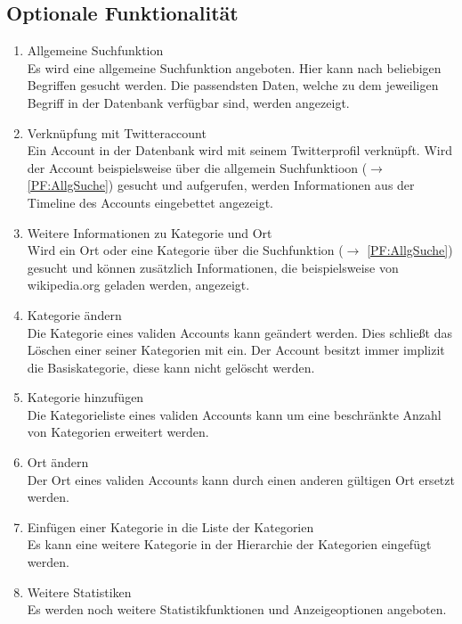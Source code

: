 \subsection{Optionale Funktionalität}

\begin{enumerate}[ align=left, label={\textbf{\textbackslash F50\arabic*0\textbackslash}}]
	\item Allgemeine Suchfunktion \label{PF:AllgSuche} \\
	Es wird eine allgemeine Suchfunktion angeboten. Hier kann nach beliebigen Begriffen gesucht werden. Die passendsten Daten, welche zu dem jeweiligen Begriff in der Datenbank verfügbar sind, werden angezeigt.
	\item Verknüpfung mit Twitteraccount \label{PF:Verknuepfung} \\
	Ein Account in der Datenbank wird mit seinem Twitterprofil verknüpft. Wird der Account beispielsweise über die allgemein Suchfunktioon ($\rightarrow$ \ref{PF:AllgSuche}) gesucht und aufgerufen, werden Informationen aus der Timeline des Accounts eingebettet angezeigt. 
	\item Weitere Informationen zu Kategorie und Ort \label{PF:WeiterInfos} \\
	Wird ein Ort oder eine Kategorie über die Suchfunktion ($\rightarrow$ \ref{PF:AllgSuche}) gesucht und können zusätzlich Informationen, die beispielsweise von wikipedia.org geladen werden, angezeigt.
	\item Kategorie ändern \label{PF:KategorieAendern} \\
	Die Kategorie eines validen Accounts kann geändert werden. Dies schließt das Löschen einer seiner Kategorien mit ein. Der Account besitzt immer implizit die Basiskategorie, diese kann nicht gelöscht werden.
	\item Kategorie hinzufügen \label{PF:KategorieHinzu} \\
	Die Kategorieliste eines validen Accounts kann um eine beschränkte Anzahl von Kategorien erweitert werden. 
	\item Ort ändern \label{PF:OrtAendern} \\
	Der Ort eines validen Accounts kann durch einen anderen gültigen Ort ersetzt werden.
	\item Einfügen einer Kategorie in die Liste der Kategorien  \label{PF:KategorieHinzu} \\
	Es kann eine weitere Kategorie in der Hierarchie der Kategorien eingefügt werden.
	\item Weitere Statistiken \label{PF:Statistiken} \\
	Es werden noch weitere Statistikfunktionen und Anzeigeoptionen angeboten.
\end{enumerate}
